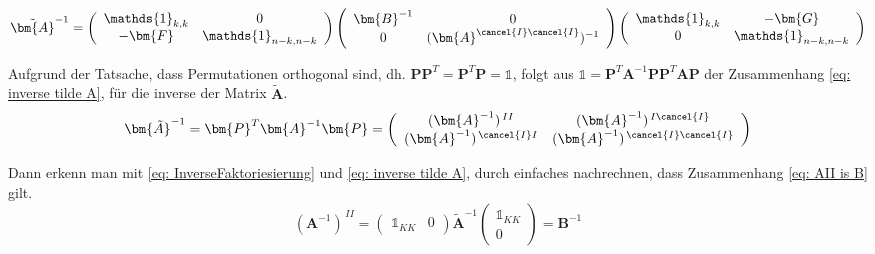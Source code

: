 \begin{equation}
    \tilde{\bm{A}}^{-1} = 
    \left(\begin{array}{cc} 
        \mathds{1}_{k,k}      &  0 \\
        -\bm{F} &  \mathds{1}_{n-k, n-k}
    \end{array}\right)
    \left(\begin{array}{cc} 
        \bm{B}^{-1}      &  0 \\
        0 &  (\bm{A}^{\cancel{I} \cancel{I}})^{-1}
    \end{array}\right)
    \left(\begin{array}{cc} 
        \mathds{1}_{k, k}      &  -\bm{G} \\
         0  &  \mathds{1}_{n-k,n-k}
    \end{array}\right) \label{eq: InverseFaktoriesierung}
\end{equation}

\noindent Aufgrund der Tatsache, dass Permutationen orthogonal sind, dh. $\bm{P}\bm{P}^T=\bm{P}^T\bm{P} = \mathds{1}$, folgt aus $ \mathds{1} = \bm{P}^T\bm{A}^{-1}\bm{P} \bm{P}^T \bm{A}\bm{P}$ der Zusammenhang \eqref{eq: inverse tilde A}, für die inverse der Matrix $\bm{\tilde{A}}$.
\begin{equation}
    \bm{\tilde{A}}^{-1} = \bm{P}^T \bm{A}^{-1} \bm{P} = \left( \begin{array}{cc}
        (\bm{A}^{-1})^{\,II}          & (\bm{A}^{-1})^{\,I \cancel{I}} \\
        (\bm{A}^{-1})^{\,\cancel{I} I} & (\bm{A}^{-1})^{\,\cancel{I} \cancel{I}}
    \end{array} \right) \label{eq: inverse tilde A}
\end{equation}

\noindent Dann erkenn man mit  \eqref{eq: InverseFaktoriesierung} und \eqref{eq: inverse tilde A}, durch einfaches nachrechnen, dass Zusammenhang \eqref{eq: AII is B} gilt.
\begin{equation}
(\bm{A}^{-1})^{\,II} = 
    \left(\begin{array}{cc} 
        \mathds{1}_{K K}      &  0
    \end{array}\right) \bm{\tilde{A}}^{-1}
    \left(\begin{array}{c} 
        \mathds{1}_{K K}      \\
        0
    \end{array}\right) 
    = \bm{B}^{-1} \label{eq: AII is B}
\end{equation}

